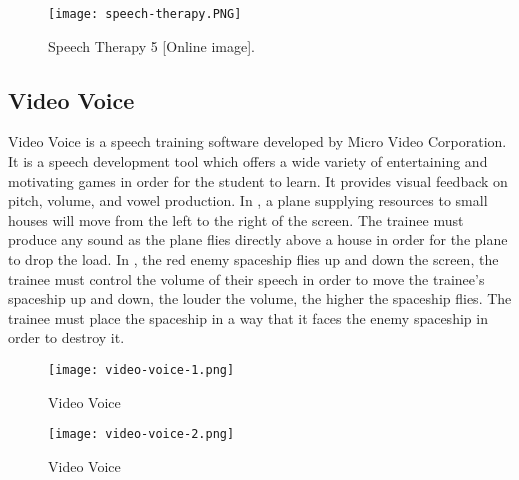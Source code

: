 \begin{figure}[h]
    \centering
    \texttt{[image: speech-therapy.PNG]}
    \caption{Speech Therapy 5 [Online image].}
    \cite{speechtherapy5:img}
    \label{fig:speechtherapy}
\end{figure}

\subsection{Video Voice}
Video Voice is a speech training software developed by Micro Video Corporation. It is a speech development tool which offers a wide variety of entertaining and motivating games in order for the student to learn. It provides visual feedback on pitch, volume, and vowel production. In , a plane supplying resources to small houses will move from the left to the right of the screen. The trainee must produce any sound as the plane flies directly above a house in order for the plane to drop the load. In , the red enemy spaceship flies up and down the screen, the trainee must control the volume of their speech in order to move the trainee's spaceship up and down, the louder the volume, the higher the spaceship flies. The trainee must place the spaceship in a way that it faces the enemy spaceship in order to destroy it.

\begin{figure}[h]
    \centering
    \texttt{[image: video-voice-1.png]}
    \caption{Video Voice}
    \label{fig:video-voice-1}
\end{figure}

\begin{figure}[h]
    \centering
    \texttt{[image: video-voice-2.png]}
    \caption{Video Voice}
    \label{fig:video-voice-2}
\end{figure}

\pagebreak

